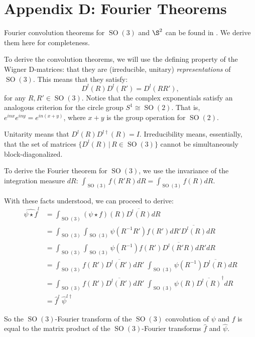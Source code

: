 \documentclass{article} %
\newcommand{\SO}[1]{\ensuremath{\operatorname{SO}(#1)}}
\begin{document}
\section*{Appendix D: Fourier Theorems}

Fourier convolution theorems for $\SO3$ and $\S^2$ can be found in \cite{Kostelec2008,Makadia2007-fv,Gutman2008-fa}.
We derive them here for completeness. 

To derive the convolution theorems, we will use the defining property of the Wigner D-matrices: that they are (irreducible, unitary) \emph{representations} of $\SO3$.
This means that they satisfy:
\begin{equation}
  D^l(R) D^l(R') = D^l(RR'),
\end{equation}
for any $R, R' \in \SO3$.
Notice that the complex exponentials satisfy an analogous criterion for the circle group $S^1 \cong \SO2$. That is, $e^{inx} e^{iny} = e^{in(x+y)}$, where $x+y$ is the group operation for $\SO2$.

Unitarity means that $D^l(R) D^{l\dagger}(R) = I$.
Irreducibility means, essentially, that the set of matrices $\{D^l(R) \, | \, R \in \SO3 \}$ cannot be simultaneously block-diagonalized.

To derive the Fourier theorem for $\SO3$, we use the invariance of the integration measure $dR$:
 $\int_{\SO3} f(R' R) dR = \int_{\SO3} f(R) dR$.

With these facts understood, we can proceed to derive:
\begin{equation}
  \begin{aligned}
    \widehat{\psi \star f}^l
    &=
    \int_{\SO3} (\psi \star f)(R) \overline{D^l(R)} dR \\
    &=
    \int_{\SO3} \int_{\SO3} \psi(R^{-1} R') f(R') dR' \overline{D^l(R)} dR \\
    &=
    \int_{\SO3} \int_{\SO3} \psi(R^{-1}) f(R') \overline{D^l(R'R)} dR' dR \\
    &=
    \int_{\SO3} f(R') \overline{D^l(R')} dR' \;  \int_{\SO3} \psi(R^{-1}) \overline{D^l(R)} dR \\
    &=
    \int_{\SO3} f(R') \overline{D^l(R')} dR' \;  \int_{\SO3} \psi(R) \overline{D^l(R)}^\dagger dR \\
    &=
    \hat{f}^l \; \hat{\psi}^{l \dagger}
  \end{aligned}
\end{equation}

So the $\SO3$-Fourier transform of the $\SO3$ convolution of $\psi$ and $f$ is equal to the matrix product of the $\SO3$-Fourier transforms $\hat{f}$ and $\hat{\psi}$.
\end{document}
